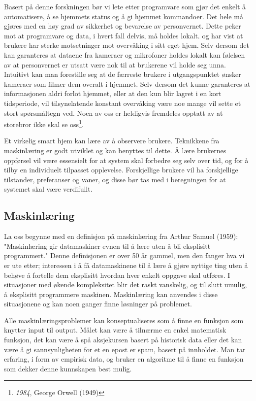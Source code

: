 Basert på denne forskningen bør vi lete etter programvare som gjør det enkelt å automatisere, å se hjemmets status og å gi hjemmet kommandoer. Det hele må gjøres med en høy grad av sikkerhet og bevarelse av personvernet. Dette peker mot at programvare og data, i hvert fall delvis, må holdes lokalt. \citet{bonino11} og \citet{userreq} har vist at brukere har sterke motsetninger mot overvåking i sitt eget hjem. Selv dersom det kan garanteres at dataene fra kameraer og mikrofoner holdes lokalt kan følelsen av at personvernet er utsatt være nok til at brukerene vil holde seg unna. Intuitivt kan man forestille seg at de færreste brukere i utgangspunktet ønsker kameraer som filmer dem overalt i hjemmet. Selv dersom det kunne garanteres at informasjonen aldri forlot hjemmet, eller at den kun blir lagret i en kort tidsperiode, vil tilsynelatende konstant overvåking være noe mange vil sette et stort spørsmåltegn ved. Noen av oss er heldigvis fremdeles opptatt av at storebror ikke skal se oss\footnote{\emph{1984}, George Orwell (1949)}.

Et virkelig smart hjem kan lære av å observere brukere. Teknikkene fra maskinlæring er godt utviklet og kan benyttes til dette. Å lære brukernes oppførsel vil være essensielt for at system skal forbedre seg selv over tid, og for å tilby en individuelt tilpasset opplevelse. Forskjellige brukere vil ha forskjellige tilstander, preferanser og vaner, og disse bør tas med i beregningen for at systemet skal være verdifullt.

\subsection{Maskinlæring}
La oss begynne med en definisjon på maskinlæring fra Arthur Samuel (1959): "Maskinlæring gir datamaskiner evnen til å lære uten å bli eksplisitt programmert." Denne definisjonen er over 50 år gammel, men den fanger hva vi er ute etter; interessen i å få datamaskinene til å lære å gjøre nyttige ting uten å behøve å fortelle dem eksplisitt hvordan hver enkelt oppgave skal utføres. I situasjoner med økende kompleksitet blir det raskt vanskelig, og til slutt umulig, å eksplisitt programmere maskinen. Maskinlæring kan anvendes i disse situasjonene og kan noen ganger finne løsninger på problemet.

Alle maskinlæringsproblemer kan konseptualiseres som å finne en funksjon som knytter input til output. Målet kan være å tilnærme en enkel matematisk funksjon, det kan være å spå aksjekursen basert på historisk data eller det kan være å gi sannsynligheten for et en epost er spam, basert på innholdet. Man tar erfaring, i form av empirisk data, og bruker en algoritme til å finne en funksjon som dekker denne kunnskapen best mulig.

